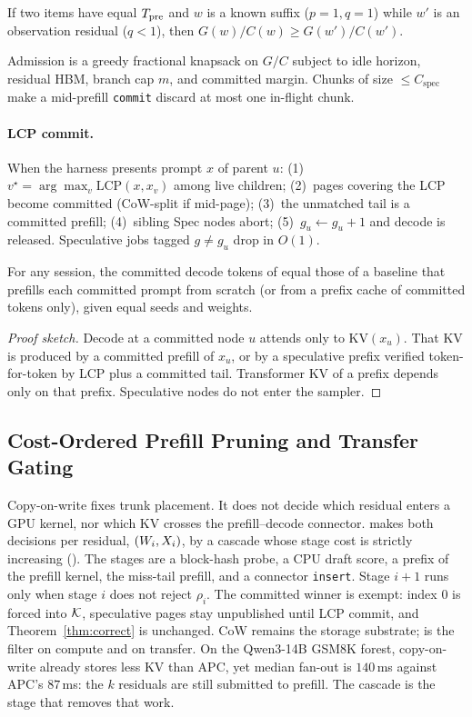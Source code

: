 \begin{proposition}
\label{prop:known}
If two items have equal $T_{\mathrm{pre}}$ and $w$ is a known suffix ($p{=}1,q{=}1$) while $w'$ is an observation residual ($q<1$), then $G(w)/C(w)\ge G(w')/C(w')$.
\end{proposition}

Admission is a greedy fractional knapsack on $G/C$ subject to idle horizon, residual HBM, branch cap $m$, and committed \tbt{} margin.
Chunks of size $\le C_{\mathrm{spec}}$ make a mid-prefill \texttt{commit} discard at most one in-flight chunk.

\paragraph{LCP commit.}
When the harness presents prompt $x$ of parent $u$:
(1)~$v^\star=\arg\max_v\mathrm{LCP}(x,x_v)$ among live children;
(2)~pages covering the LCP become committed (CoW-split if mid-page);
(3)~the unmatched tail is a committed prefill;
(4)~sibling Spec nodes abort;
(5)~$g_u\leftarrow g_u+1$ and decode is released.
Speculative jobs tagged $g\neq g_u$ drop in $O(1)$.

\begin{theorem}
\label{thm:correct}
For any session, the committed decode tokens of \sys equal those of a baseline that prefills each committed prompt from scratch (or from a prefix cache of committed tokens only), given equal seeds and weights.
\end{theorem}
\begin{proof}[Proof sketch]
Decode at a committed node $u$ attends only to $\mathrm{KV}(x_u)$.
That KV is produced by a committed prefill of $x_u$, or by a speculative prefix verified token-for-token by LCP plus a committed tail.
Transformer KV of a prefix depends only on that prefix.
Speculative nodes do not enter the sampler.
\end{proof}

\subsection{Cost-Ordered Prefill Pruning and Transfer Gating}
\label{sec:app}

Copy-on-write fixes trunk placement.
It does not decide which residual enters a GPU kernel, nor which KV crosses the prefill--decode connector.
\app makes both decisions per residual, $(W_i,X_i)$, by a cascade whose stage cost is strictly increasing ().
The stages are a block-hash probe, a CPU draft score, a prefix of the prefill kernel, the miss-tail prefill, and a connector \texttt{insert}.
Stage $i{+}1$ runs only when stage $i$ does not reject $\rho_i$.
The committed winner is exempt: index $0$ is forced into $\mathcal{K}$, speculative pages stay unpublished until LCP commit, and Theorem~\ref{thm:correct} is unchanged.
CoW remains the storage substrate; \app is the filter on compute and on transfer.
On the Qwen3-14B GSM8K forest, copy-on-write already stores less KV than APC, yet median fan-out is $140$\,ms against APC's $87$\,ms: the $k$ residuals are still submitted to prefill.
The cascade is the stage that removes that work.

